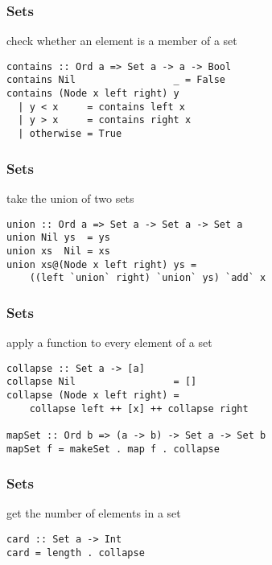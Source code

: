 \documentclass[dvipsnames]{beamer}
\theoremstyle{plain}
\begin{document}
\begin{frame}[fragile]
  \frametitle{Sets}

  \begin{exampleblock}{check whether an element is a member of a set}
    \begin{lstlisting}
contains :: Ord a => Set a -> a -> Bool
contains Nil                 _ = False
contains (Node x left right) y
  | y < x     = contains left x
  | y > x     = contains right x
  | otherwise = True
    \end{lstlisting}
  \end{exampleblock}
\end{frame}

\begin{frame}[fragile]
  \frametitle{Sets}

  \begin{exampleblock}{take the union of two sets}
    \begin{lstlisting}[deletekeywords={union}]
union :: Ord a => Set a -> Set a -> Set a
union Nil ys  = ys
union xs  Nil = xs
union xs@(Node x left right) ys =
    ((left `union` right) `union` ys) `add` x
    \end{lstlisting}
  \end{exampleblock}
\end{frame}

\begin{frame}[fragile]
  \frametitle{Sets}

  \begin{exampleblock}{apply a function to every element of a set}
    \begin{lstlisting}
collapse :: Set a -> [a]
collapse Nil                 = []
collapse (Node x left right) =
    collapse left ++ [x] ++ collapse right

mapSet :: Ord b => (a -> b) -> Set a -> Set b
mapSet f = makeSet . map f . collapse
    \end{lstlisting}
  \end{exampleblock}
\end{frame}

\begin{frame}[fragile]
  \frametitle{Sets}

  \begin{exampleblock}{get the number of elements in a set}
    \begin{lstlisting}
card :: Set a -> Int
card = length . collapse
    \end{lstlisting}
  \end{exampleblock}
\end{frame}
\end{document}
